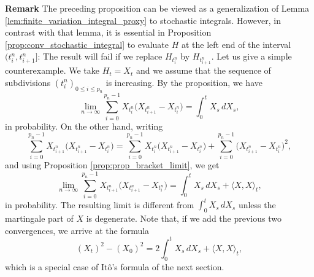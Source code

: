 \documentclass[../Main.tex]{subfiles}
\begin{document}

\textbf{Remark}
The preceding proposition can be viewed as a generalization of
Lemma \ref{lem:finite_variation_integral_proxy} to stochastic integrals. However, in contrast with that lemma, it is
essential in Proposition \ref{prop:conv_stochastic_integral} to evaluate \(H\) at the left end of the interval
\((t_i^n,t_{i+1}^n]\): The result will fail if we replace \(H_{t_i^n}\) by
\(H_{t_{i+1}^n}\). Let us give a simple counterexample. We take \(H_t=X_t\)
and we assume that the sequence of subdivisions
\((t_i^n)_{0\leq i\leq p_n}\) is increasing. By the proposition, we have
\[
    \lim_{n\to\infty}
    \sum_{i=0}^{p_n-1}
    X_{t_i^n}\bigl(X_{t_{i+1}^n}-X_{t_i^n}\bigr)
    =
    \int_0^t X_s\,dX_s,
\]
in probability. On the other hand, writing
\[
    \sum_{i=0}^{p_n-1}
    X_{t_{i+1}^n}\bigl(X_{t_{i+1}^n}-X_{t_i^n}\bigr)
    =
    \sum_{i=0}^{p_n-1}
    X_{t_i^n}\bigl(X_{t_{i+1}^n}-X_{t_i^n}\bigr)
    +
    \sum_{i=0}^{p_n-1}
    \bigl(X_{t_{i+1}^n}-X_{t_i^n}\bigr)^2,
\]
and using Proposition \ref{prop:prop_bracket_limit}, we get
\[
    \lim_{n\to\infty}
    \sum_{i=0}^{p_n-1}
    X_{t_{i+1}^n}\bigl(X_{t_{i+1}^n}-X_{t_i^n}\bigr)
    =
    \int_0^t X_s\,dX_s+\langle X,X\rangle_t,
\]
in probability. The resulting limit is different from
\(\int_0^t X_s\,dX_s\) unless the martingale part of \(X\) is degenerate.
Note that, if we add the previous two convergences, we arrive at the formula
\[
    (X_t)^2-(X_0)^2
    =
    2\int_0^t X_s\,dX_s+\langle X,X\rangle_t,
\]
which is a special case of Itô's formula of the next section.
\end{document}

